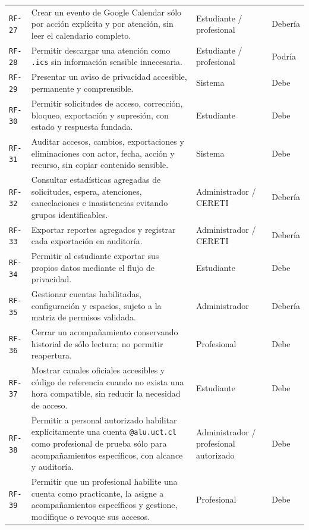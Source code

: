 \documentclass[10pt,a4paper,oneside]{article}
\newcommand{\id}[1]{\texttt{#1}}
\begin{document}
\begin{longtable}{@{}L{0.065\textwidth}L{0.60\textwidth}L{0.15\textwidth}L{0.14\textwidth}@{}}
\id{RF-27} & Crear un evento de Google Calendar sólo por acción explícita y por atención, sin leer el calendario completo. & Estudiante / profesional & Debería\\
\id{RF-28} & Permitir descargar una atención como \texttt{.ics} sin información sensible innecesaria. & Estudiante / profesional & Podría\\
\id{RF-29} & Presentar un aviso de privacidad accesible, permanente y comprensible. & Sistema & Debe\\
\id{RF-30} & Permitir solicitudes de acceso, corrección, bloqueo, exportación y supresión, con estado y respuesta fundada. & Estudiante & Debe\\
\id{RF-31} & Auditar accesos, cambios, exportaciones y eliminaciones con actor, fecha, acción y recurso, sin copiar contenido sensible. & Sistema & Debe\\
\id{RF-32} & Consultar estadísticas agregadas de solicitudes, espera, atenciones, cancelaciones e inasistencias evitando grupos identificables. & Administrador / CERETI & Debería\\
\id{RF-33} & Exportar reportes agregados y registrar cada exportación en auditoría. & Administrador / CERETI & Debería\\
\id{RF-34} & Permitir al estudiante exportar sus propios datos mediante el flujo de privacidad. & Estudiante & Debe\\
\id{RF-35} & Gestionar cuentas habilitadas, configuración y espacios, sujeto a la matriz de permisos validada. & Administrador & Debería\\
\id{RF-36} & Cerrar un acompañamiento conservando historial de sólo lectura; no permitir reapertura. & Profesional & Debe\\
\id{RF-37} & Mostrar canales oficiales accesibles y código de referencia cuando no exista una hora compatible, sin reducir la necesidad de acceso. & Estudiante & Debe\\
\id{RF-38} & Permitir a personal autorizado habilitar explícitamente una cuenta \texttt{@alu.uct.cl} como profesional de prueba sólo para acompañamientos específicos, con alcance y auditoría. & Administrador / profesional autorizado & Debe\\
\id{RF-39} & Permitir que un profesional habilite una cuenta como practicante, la asigne a acompañamientos específicos y gestione, modifique o revoque sus accesos. & Profesional & Debe\\
\end{longtable}
\normalsize
\end{document}
